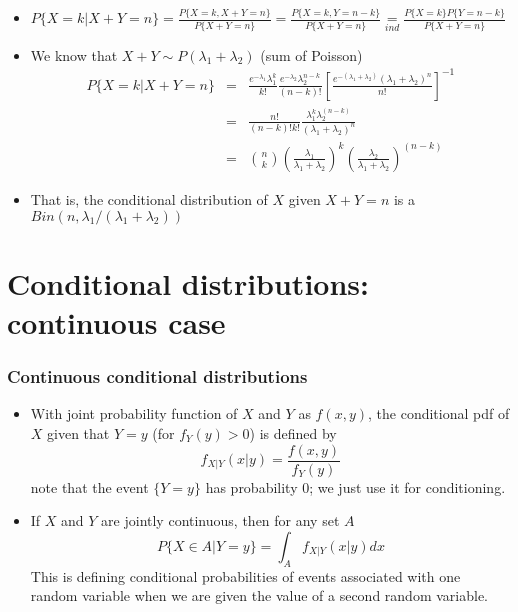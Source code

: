\documentclass[slidestop,compress,mathserif]{beamer}
\begin{document}
\begin{frame}%
\pause
{\small{
\begin{itemize}
\item $P\{X = k | X + Y = n\} = \frac{P\{X = k, X + Y = n\}}{P\{X + Y = n\}} = \frac{P\{X = k, Y = n - k\}}{P\{X + Y = n\}} \underset{ind}{=} \frac{P\{X = k\}P\{ Y = n - k\}}{P\{X + Y = n\}}$
\pause
\item We know that $X + Y \sim P(\lambda_1 + \lambda_2)$ (sum of Poisson)
\begin{eqnarray*}
P\{X = k | X + Y = n\} &=& \frac{e^{-\lambda_1}\lambda_1^k}{k!}\frac{e^{-\lambda_2}\lambda_2^{n-k}}{(n-k)!}[\frac{e^{-(\lambda_1+\lambda_2)}(\lambda_1+\lambda_2)^n}{n!}]^{-1}\\
    &=&
    \frac{n!}{(n-k)!k!}\frac{\lambda_1^k\lambda_2^{(n-k)}}{(\lambda_1+\lambda_2)^n}\\
    &=&
    {n \choose k} \left(\frac{\lambda_1}{\lambda_1+\lambda_2}\right)^k\left(\frac{\lambda_2}{\lambda_1+\lambda_2}\right)^{(n-k)}
\end{eqnarray*}
\item That is, the conditional distribution of $X$ given $X + Y = n$ is a $Bin(n, \lambda_1/(\lambda_1+\lambda_2))$
\end{itemize}
}}

\end{frame}
\section{Conditional distributions: continuous case}


\begin{frame}\frametitle{Continuous conditional distributions}
\begin{itemize}
\item With joint probability function of $X$ and $Y$ as $f(x, y)$, the conditional pdf of $X$ given that $Y = y$ (for $f_Y(y) > 0$) is defined by
$$f_{X|Y}(x|y) = \frac{f(x, y)}{f_Y(y)}$$
note that the event $\{Y = y\}$ has probability $0$; we just use it for conditioning.
\item If $X$ and $Y$ are jointly continuous, then for any set $A$
$$P\{X \in A|Y = y\} = \int_A f_{X|Y}(x|y)dx$$
This is defining conditional probabilities of events associated with one random variable when we are given the value of a second random variable.
\end{itemize}
\end{frame}
\end{document}
